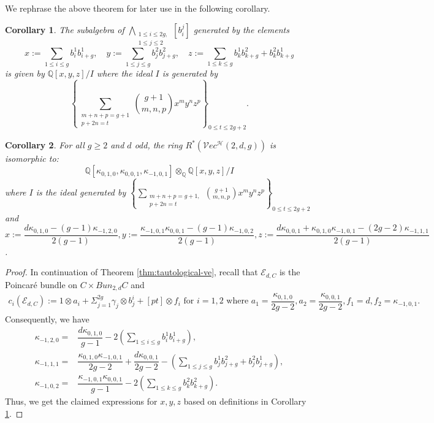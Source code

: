\documentclass[11pt]{amsart}
\newtheorem{corollary}{Corollary}[theorem]
\theoremstyle{definition}
\newcommand{\p}{\mathbb{P}}
\newcommand{\h}{\mathcal{H}}
\newcommand{\ve}{\mathcal{V}ec}
\newcommand{\E}{\mathscr{E}}
\newcommand{\Q}{\mathbb{Q}}
\newcommand{\ka}{\kappa}
\begin{document}
We rephrase the above theorem for later use in the following corollary.
\begin{corollary}\label{cor:ext-alg}
    The subalgebra of $\underset{\substack{1\leq i\leq 2g,\\1\leq j\leq 2}}{\bigwedge} [b^j_i]$ generated by the elements
    $$x:= \sum_{1\leq i\leq g} b^1_ib^1_{i+g}, \quad y:= \sum_{1\leq j\leq g} b^2_jb^2_{j+g}, \quad z:= \sum_{1\leq k\leq g} b^1_kb^2_{k+g}+b^2_kb^1_{k+g}$$
    is given by $\Q[x,y,z]/I$ where the ideal $I$ is generated by
    $$ \left\{\sum_{\substack{m+n+p=g+1\\p+2n=t}}{{g+1}\choose{m,n,p}}x^my^nz^p\right\}_{0\leq t\leq 2g+2}.$$
\end{corollary}
\begin{corollary} \label{kappa computation}
  For all $g\geq 2 $ and $d$ odd, the ring $R^*(\ve^\h(2,d,g))$ is isomorphic to:
    $$\Q[\ka_{0,1,0},\ka_{0,0,1},\ka_{-1,0,1}]\otimes_\Q \Q[x,y,z]/I$$
    where $I$ is the ideal generated by $\left\{{\sum}_{\substack{m+n+p=g+1,\\p+2n=t}}{{g+1}\choose{m,n,p}}x^my^nz^p\right\}_{0\leq t\leq 2g+2}$
    and \\
    $x:= \dfrac{d\ka_{0,1,0}-(g-1)\ka_{-1,2,0}}{2(g-1)},y:= \dfrac{\ka_{-1,0,1}\ka_{0,0,1}-(g-1)\ka_{-1,0,2} }{2(g-1) },z:= \dfrac{ d\ka_{0,0,1}+\ka_{0,1,0}\ka_{-1,0,1}-(2g-2)\ka_{-1,1,1}}{2(g-1)}$.
\end{corollary}
\begin{proof}
    In continuation of Theorem \ref{thm:tautological-ve}, recall that $\E_{d,C}$ is the Poincar\'e bundle on $C\times Bun_{2,d}C$ and
\begin{gather*}
c_i(\E_{d,C}) := 1\otimes a_i+\Sigma_{j=1}^{2g}\gamma_j\otimes b_{j}^i+[pt]\otimes f_i \text{ for }i=1,2\text{ where }
a_1 = \dfrac{\ka_{0,1,0}}{2g-2},a_2 = \dfrac{\ka_{0,0,1}}{2g-2}, f_1 = d, f_2 = \ka_{-1,0,1}.
\end{gather*}
Consequently, we have
\begin{align*}
    \ka_{-1,2,0} = &\dfrac{d\ka_{0,1,0}}{g-1}-2 \left (\sum_{1\leq i\leq g}b^1_ib^1_{i+g} \right ),\\
    \ka_{-1,1,1} =& \dfrac{\ka_{0,1,0}\ka_{-1,0,1}}{2g-2}+\dfrac{d\ka_{0,0,1}}{2g-2}-\left (\sum_{1\leq j\leq g}b^1_jb^2_{j+g}+b^2_jb^1_{j+g} \right),\\
    \ka_{-1,0,2} = &\dfrac{\ka_{-1,0,1}\ka_{0,0,1}}{g-1}-2 \left (\sum_{1\leq k\leq g}b^2_kb^2_{k+g} \right ).
\end{align*}
Thus, we get the claimed expressions for $x,y,z$ based on definitions in Corollary \ref{cor:ext-alg}.
\end{proof}
\end{document}
